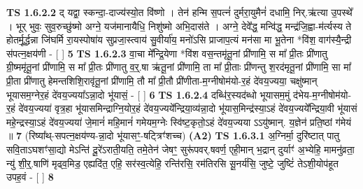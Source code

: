 \documentclass[17pt]{extarticle}
\begin{document}
                  \newline
                                \textbf{ TS 1.6.2.2} \newline
                  द् यद्वा॒ स्कन्दा॒-दाज्य॑स्यो॒त वि॑ष्णो । तेन॑ हन्मि स॒पत्नं॑ दुर्मरा॒युमैनं॑ दधामि॒ निर्.ऋ॑त्या उ॒पस्थे᳚ । भूर् भुवः॒ सुव॒रुच्छु॑ष्मो अग्ने॒ यज॑मानायैधि॒ निशु॑ष्मो अभि॒दास॑ते । अग्ने॒ देवे᳚द्ध॒ मन्वि॑द्ध॒ मन्द्र॑जि॒ह्वा-म॑र्त्यस्य ते होतर्मू॒र्द्धन्ना जि॑घर्मि रा॒यस्पोषा॑य सुप्रजा॒स्त्वाय॑ सु॒वीर्या॑य॒ मनो॑ऽसि प्राजाप॒त्यं मन॑सा मा भू॒तेना *वि॑श॒ वाग॑स्यै॒न्द्री स॑पत्न॒क्षय॑णी - [ ] \textbf{  5} \newline
                  \newline
                                \textbf{ TS 1.6.2.3} \newline
                  वा॒चा मे᳚न्द्रि॒येणा *वि॑श वस॒न्तमृ॑तू॒नां प्री॑णामि॒ स मा᳚ प्री॒तः प्री॑णातु ग्री॒ष्ममृ॑तू॒नां प्री॑णामि॒ स मा᳚ प्री॒तः प्री॑णातु व॒र्॒.षा ऋ॑तू॒नां प्री॑णामि॒ ता मा᳚ प्री॒ताः प्री॑णन्तु श॒रद॑मृतू॒नां प्री॑णामि॒ सा मा᳚ प्री॒ता प्री॑णातु हेमन्तशिशि॒रावृ॑तू॒नां प्री॑णामि॒ तौ मा᳚ प्री॒तौ प्री॑णीता-म॒ग्नीषोम॑यो-र॒हं दे॑वय॒ज्यया॒ चक्षु॑ष्मान् भूयासम॒ग्नेर॒हं दे॑वय॒ज्यया᳚ऽन्ना॒दो भू॑यासं॒ - [ ] \textbf{  6} \newline
                  \newline
                                \textbf{ TS 1.6.2.4} \newline
                  दब्धि॑र॒स्यद॑ब्धो भूयासम॒मुं द॑भेय-म॒ग्नीषोम॑यो-र॒हं दे॑वय॒ज्यया॑ वृत्र॒हा भू॑यासमिन्द्राग्नि॒योर॒हं दे॑वय॒ज्यये᳚न्द्रिया॒व्य॑न्ना॒दो भू॑यास॒मिन्द्र॑स्या॒ऽहं दे॑वय॒ज्यये᳚न्द्रिया॒वी भू॑यासं महे॒न्द्रस्या॒ऽहं दे॑वय॒ज्यया॑ जे॒मानं॑ महि॒मानं॑ गमेयम॒ग्नेः स्वि॑ष्ट॒कृतो॒ऽहं दे॑वय॒ज्यया ऽऽयु॑ष्मान्. य॒ज्ञेन॑ प्रति॒ष्ठां ग॑मेयं ॥ \textbf{  7 } \newline
                  \newline
                      (रिष्या᳚थ्-सपत्न॒क्षय॑ण्य-न्ना॒दो भू॑यासꣳ॒॒-षट्त्रिꣳ॑शच्च)  \textbf{(A2)} \newline \newline
                                        \textbf{ TS 1.6.3.1} \newline
                  अ॒ग्निर्मा॒ दुरि॑ष्टात् पातु सवि॒ताऽघशꣳ॑सा॒द्यो मेऽन्ति॑ दू॒रे॑ऽराती॒यति॒ तमे॒तेन॑ जेषꣳ॒॒ सुरू॑पवर्.षवर्ण॒ एही॒मान् भ॒द्रान् दुर्याꣳ॑ अ॒भ्येहि॒ मामनु॑व्रता॒ न्यु॑ शी॒र्॒.षाणि॑ मृढ्व॒मिड॒ एह्यदि॑त॒ एहि॒ सर॑स्व॒त्येहि॒ रन्ति॑रसि॒ रम॑तिरसि सू॒नर्य॑सि॒ जुष्टे॒ जुष्टिं॑ तेऽशी॒योप॑हूत उपह॒वं - [ ] \textbf{  8} \newline
                  \newline
\end{document}
